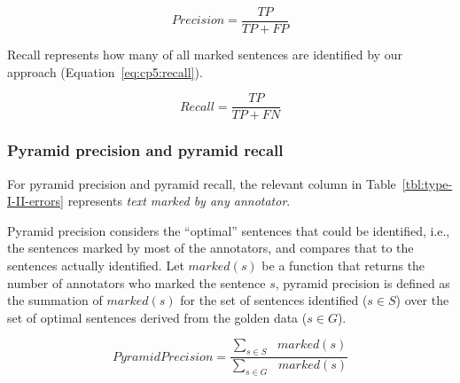 \begin{equation}
\label{eq:cp5:precision}    
    Precision = \frac{TP}{TP + FP}
\end{equation}

\vspace{2mm}
Recall represents how many of all marked sentences are identified by our approach (Equation~\ref{eq:cp5:recall}).


\begin{equation}
\label{eq:cp5:recall}        
    Recall = \frac{TP}{TP + FN}
\end{equation}




\subsubsection{Pyramid precision and pyramid recall}


For pyramid precision and pyramid recall, the relevant column in Table~\ref{tbl:type-I-II-errors} represents \textit{text marked by any annotator}. 


Pyramid precision considers the ``optimal'' sentences that could be identified, i.e., the sentences marked by most of the annotators, and compares that to the sentences actually identified. Let $marked(s)$ be a function that returns the number of annotators who marked the sentence $s$, pyramid precision is defined as 
the summation of $marked(s)$ for the set of sentences identified ($s \in S$) over the set of optimal sentences derived from the golden data ($s \in G$).



\begin{equation}
\label{eq:cp5:pyramid-precision}    
    Pyramid Precision =  \frac{
        \sum_{s \in S} \text{ } marked(s)
    }{
        \sum_{s \in G} \text{ } marked(s)
    }
\end{equation}






